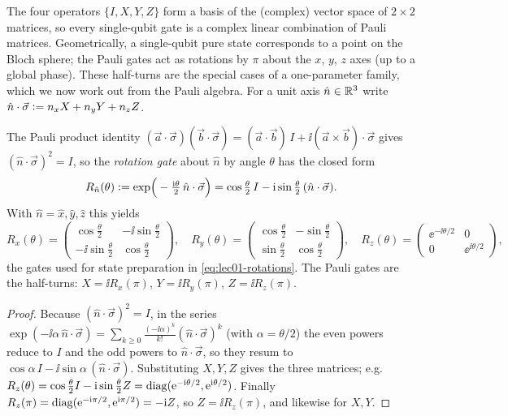 The four operators $\{I,X,Y,Z\}$ form a basis of the (complex) vector space of
$2\times2$ matrices, so every single-qubit gate is a complex linear combination of
Pauli matrices. Geometrically, a single-qubit pure state corresponds to a point on
the Bloch sphere; the Pauli gates act as rotations by $\pi$ about the $x$, $y$, $z$
axes (up to a global phase). These half-turns are the special cases of a
one-parameter family, which we now work out from the Pauli algebra. For a unit axis
$\hat n\in\mathbb{R}^{3}$ write $\hat n\cdot\vec\sigma\vcentcolon= n_xX+n_yY+n_zZ$.

\begin{proposition}\label{prop:lec01-rot}
The Pauli product identity
$(\vec a\cdot\vec\sigma)(\vec b\cdot\vec\sigma)=(\vec a\cdot\vec b)\,I+\ii(\vec a\times\vec b)\cdot\vec\sigma$
gives $(\hat n\cdot\vec\sigma)^{2}=I$, so the \emph{rotation gate} about $\hat n$ by
angle $\theta$ has the closed form
\[
  R_{\hat n}(\theta)\vcentcolon=\exp\!\Big(-\tfrac{\mathrm{i}\theta}{2}\,\hat n\cdot\vec\sigma\Big)
  =\cos\tfrac{\theta}{2}\,I-\mathrm{i}\sin\tfrac{\theta}{2}\,(\hat n\cdot\vec\sigma).
\]
With $\hat n=\hat x,\hat y,\hat z$ this yields
\[
  R_x(\theta)=\begin{pmatrix}\cos\tfrac{\theta}{2}&-\ii\sin\tfrac{\theta}{2}\\[2pt]
      -\ii\sin\tfrac{\theta}{2}&\cos\tfrac{\theta}{2}\end{pmatrix},\quad
  R_y(\theta)=\begin{pmatrix}\cos\tfrac{\theta}{2}&-\sin\tfrac{\theta}{2}\\[2pt]
      \sin\tfrac{\theta}{2}&\cos\tfrac{\theta}{2}\end{pmatrix},\quad
  R_z(\theta)=\begin{pmatrix}\ee^{-\ii\theta/2}&0\\0&\ee^{\ii\theta/2}\end{pmatrix},
\]
the gates used for state preparation in \eqref{eq:lec01-rotations}. The Pauli gates
are the half-turns: $X=\ii R_x(\pi)$, $Y=\ii R_y(\pi)$, $Z=\ii R_z(\pi)$.
\end{proposition}

\begin{proof}
Because $(\hat n\cdot\vec\sigma)^{2}=I$, in the series
$\exp(-\ii\alpha\,\hat n\cdot\vec\sigma)=\sum_{k\ge0}\tfrac{(-\ii\alpha)^{k}}{k!}(\hat n\cdot\vec\sigma)^{k}$
(with $\alpha=\theta/2$) the even powers reduce to $I$ and the odd powers to
$\hat n\cdot\vec\sigma$, so they resum to $\cos\alpha\,I-\ii\sin\alpha\,(\hat n\cdot\vec\sigma)$.
Substituting $X,Y,Z$ gives the three matrices; e.g.\
$R_z(\theta)=\cos\tfrac{\theta}{2}I-\mathrm{i}\sin\tfrac{\theta}{2}Z=\operatorname{diag}(\mathrm{e}^{-\mathrm{i}\theta/2},\mathrm{e}^{\mathrm{i}\theta/2})$.
Finally $R_z(\pi)=\operatorname{diag}(\mathrm{e}^{-\mathrm{i}\pi/2},\mathrm{e}^{\mathrm{i}\pi/2})=-\mathrm{i} Z$, so $Z=\ii R_z(\pi)$,
and likewise for $X,Y$.
\end{proof}

